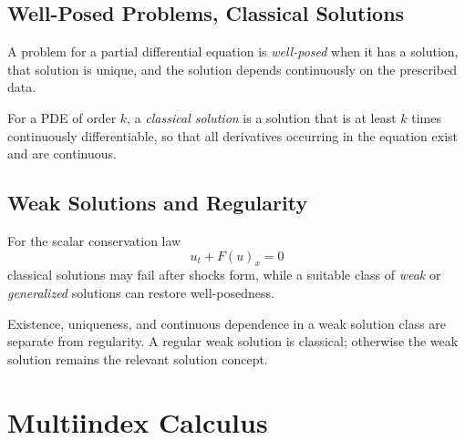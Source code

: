 \subsection{Well-Posed Problems, Classical Solutions}
\label{sec:well-posed-classical-solutions}

\begin{definition}
\label{def:well-posed-problem}
\leanok
A problem for a partial differential equation is \textit{well-posed} when it has a solution, that solution is unique, and the solution depends continuously on the prescribed data.
\end{definition}

\begin{definition}
\label{def:classical-solution}
\leanok
For a PDE of order $k$, a \textit{classical solution} is a solution that is at least $k$ times continuously differentiable, so that all derivatives occurring in the equation exist and are continuous.
\end{definition}

\subsection{Weak Solutions and Regularity}
\label{sec:weak-solutions-regularity}

For the scalar conservation law
$$u_t + F(u)_x = 0$$
classical solutions may fail after shocks form, while a suitable class of
\emph{weak} or \emph{generalized} solutions can restore well-posedness.

Existence, uniqueness, and continuous dependence in a weak solution class are
separate from regularity. A regular weak solution is classical; otherwise the
weak solution remains the relevant solution concept.

\section{Multiindex Calculus}
\label{sec:multiindex-calculus}

